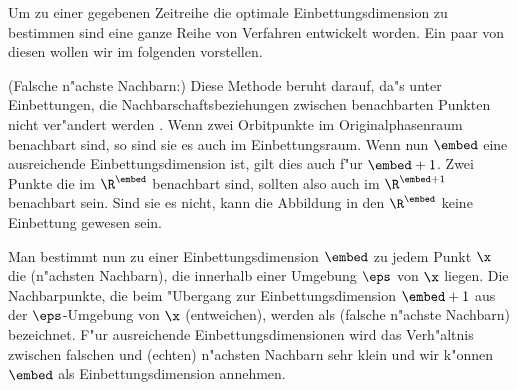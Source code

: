 Um zu einer gegebenen Zeitreihe die optimale Einbettungsdimension zu bestimmen sind eine
ganze Reihe von Verfahren entwickelt worden. Ein paar von diesen wollen wir im folgenden
vorstellen.
\begin{myitemize}
\item \rem(Falsche n"achste Nachbarn:) Diese Methode beruht darauf, da"s unter
  Einbettungen, die Nachbarschaftsbeziehungen zwischen benachbarten Punkten nicht
  ver\-"an\-dert werden \cite{Kennel92}. Wenn zwei Orbitpunkte im Originalphasenraum benachbart
  sind, so sind sie es auch im Einbettungsraum. Wenn nun $\embed$ eine ausreichende
  Einbettungsdimension ist, gilt dies auch f"ur $\embed+1$. Zwei Punkte die im $\R^\embed$
  benachbart sind, sollten also auch im $\R^{\embed+1}$ benachbart sein. Sind sie es
  nicht, kann die Abbildung in den $\R^\embed$ keine Einbettung gewesen sein.
  
  Man bestimmt nun zu einer Einbettungsdimension $\embed$ zu jedem Punkt $\x$ die
  \begriff(n"achsten Nachbarn), die innerhalb einer Umgebung $\eps$ von $\x$ liegen. Die
  Nachbarpunkte, die beim "Ubergang zur Einbettungsdimension $\embed+1$ aus der
  $\eps$-Umgebung von $\x$ \metapher(entweichen), werden als \begriff(falsche n"achste
  Nachbarn) bezeichnet. F"ur ausreichende Einbettungsdimensionen wird das Verh"altnis
  zwischen falschen und \metapher(echten) n"achsten Nachbarn sehr klein und wir
  k"onnen $\embed$ als Einbettungsdimension annehmen.
  

\end{myitemize}
